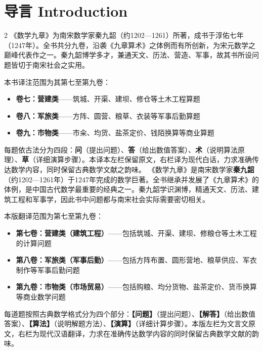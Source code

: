 \documentclass[11pt,a4paper]{article}
\begin{document}
\tableofcontents
\newpage

\section{导言 Introduction}

\begin{paracol}{2}
《数学九章》为南宋数学家秦九韶（约1202—1261）所著，成书于淳佑七年（1247年）。全书共分九卷，沿袭《九章算术》之体例而有所创新，为宋元数学之巅峰代表作之一。秦九韶博学多才，兼通天文、历法、营造、军事，故其书所设问题皆切于南宋社会之实用。

本书译注范围为其第七至第九卷：
\begin{itemize}
  \item \textbf{卷七：营建类}——筑城、开渠、建坝、修仓等土木工程算题
  \item \textbf{卷八：军旅类}——方阵、圆营、粮草、衣装等军事后勤算题
  \item \textbf{卷九：市物类}——市籴、均货、盐茶定价、钱陌换算等商业算题
\end{itemize}

每题依古法分为四段：\textbf{问}（提出问题）、\textbf{答}（给出数值答案）、\textbf{术}（说明算法原理）、\textbf{草}（详细演算步骤）。本译本左栏保留原文，右栏译为现代白话，力求准确传达数学内容，同时保留古典数学文献之韵味。
\switchcolumn
《数学九章》是南宋数学家\textbf{秦九韶}（约1202—1261年）于1247年完成的数学巨著。全书继承并发展了《九章算术》的体例，是中国古代数学最重要的经典之一。秦九韶学识渊博，精通天文、历法、建筑工程和军事学，因此书中问题都与南宋社会实际需要密切相关。

本版翻译范围为第七至第九卷：
\begin{itemize}
  \item \textbf{第七卷：营建类（建筑工程）}——包括筑城、开渠、建坝、修粮仓等土木工程的计算问题
  \item \textbf{第八卷：军旅类（军事后勤）}——包括方阵布置、圆形营地、粮草供应、军衣制作等军事后勤问题
  \item \textbf{第九卷：市物类（市场贸易）}——包括购粮、均分货物、盐茶定价、货币换算等商业数学问题
\end{itemize}

每道题按照古典数学格式分为四个部分：\textbf{【问题】}（提出问题）、\textbf{【解答】}（给出数值答案）、\textbf{【算法】}（说明解题方法）、\textbf{【演算】}（详细计算步骤）。本版左栏为文言文原文，右栏为现代汉语翻译，力求在准确传达数学内容的同时保留古典数学文献的韵味。
\end{paracol}
\end{document}
